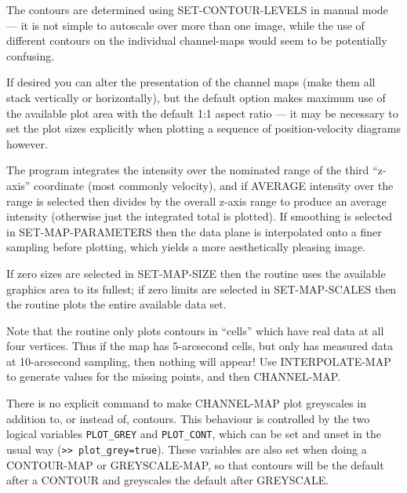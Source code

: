 \documentclass[11pt,twoside]{report}
\begin{document}
The contours are determined using SET-CONTOUR-LEVELS in manual mode ---
it is not simple to autoscale over more than one image, while the use
of different contours on the individual channel-maps would seem to be
potentially confusing.

If desired you can alter the presentation of the channel maps (\ie make
them all stack vertically or horizontally), but the default option makes
maximum use of the available plot area with the default 1:1 aspect ratio ---
it may be necessary to set the plot sizes explicitly when plotting a sequence
of position-velocity diagrams however.

The program integrates the intensity over the nominated range of the third
``z-axis'' coordinate (most commonly velocity), and if AVERAGE intensity
over the range is selected then divides by the overall z-axis range to 
produce an average intensity (otherwise just the integrated total is plotted).
If smoothing is selected in SET-MAP-PARAMETERS then the data plane is
interpolated onto a finer sampling before plotting, which yields a more
aesthetically pleasing image.

If zero sizes are selected in SET-MAP-SIZE then the routine uses the
available graphics area to its fullest; if zero limits are selected in
SET-MAP-SCALES then the routine plots the entire available data set.

Note that the routine only plots contours in ``cells'' which have real
data at all four vertices. Thus if the map has 5-arcsecond cells, but only
has measured data at 10-arcsecond sampling, then nothing will appear! Use
INTERPOLATE-MAP to generate values for the missing points, and then
CHANNEL-MAP.

There is no explicit command to make CHANNEL-MAP plot greyscales in addition
to, or instead of, contours. This behaviour is controlled by the two
logical variables \verb+PLOT_GREY+ and \verb+PLOT_CONT+, which can be set
and unset in the usual way (\eg \verb+>> plot_grey=true+). These variables
are also set when doing a CONTOUR-MAP or GREYSCALE-MAP, so that contours
will be the default after a CONTOUR and greyscales the default after GREYSCALE.
\end{document}
